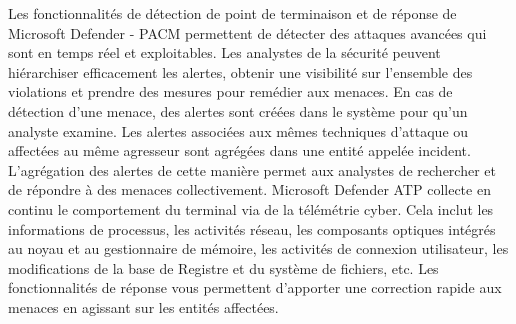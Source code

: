Les fonctionnalités de détection de point de terminaison et de réponse de Microsoft Defender - PACM permettent de détecter des attaques avancées qui sont en temps réel et exploitables. Les analystes de la sécurité peuvent hiérarchiser efficacement les alertes, obtenir une visibilité sur l’ensemble des violations et prendre des mesures pour remédier aux menaces.
En cas de détection d’une menace, des alertes sont créées dans le système pour qu’un analyste examine. Les alertes associées aux mêmes techniques d’attaque ou affectées au même agresseur sont agrégées dans une entité appelée incident. L’agrégation des alertes de cette manière permet aux analystes de rechercher et de répondre à des menaces collectivement.
Microsoft Defender ATP collecte en continu le comportement du terminal via de la télémétrie cyber. Cela inclut les informations de processus, les activités réseau, les composants optiques intégrés au noyau et au gestionnaire de mémoire, les activités de connexion utilisateur, les modifications de la base de Registre et du système de fichiers, etc.  Les fonctionnalités de réponse vous permettent d’apporter une correction rapide aux menaces en agissant sur les entités affectées.